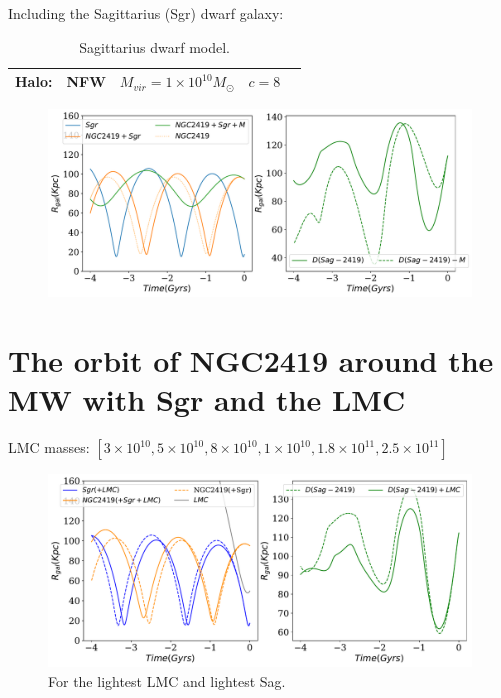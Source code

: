 \documentclass[14pt]{article}
\begin{document}
Including the Sagittarius (Sgr) dwarf galaxy:


\begin{table}
\centering
\begin{tabular}{c c c c c}
\hline
\hline
Halo: & NFW & $M_{vir} = 1\times 10^{10} M_{\odot}$ & $c=8$  \\
\hline
\hline
\end{tabular}
\caption{Sagittarius dwarf model.}
\end{table}


\begin{figure}[H]
\centering
\includegraphics[scale=0.5]{../exploratory_code/NGC2419_sphMWSGR.pdf}
\end{figure}


\section{The orbit of NGC2419 around the MW with Sgr and the LMC}

LMC masses: $[3\times10^{10}, 5\times10^{10}, 8\times10^{10},
1\times10^{10}, 1.8\times10^{11}, 2.5\times10^{11}]$



\begin{figure}[H]
\centering
\includegraphics[scale=0.5]{../exploratory_code/NGC2419_sphMWSGRLMC.pdf}
\caption{For the lightest LMC and lightest Sag.}
\end{figure}
\end{document}
